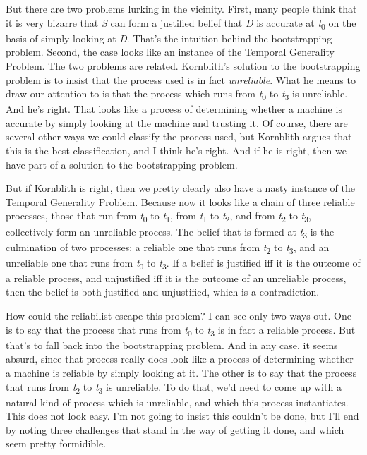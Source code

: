 \documentclass[
  11pt,
  letterpaper,
  DIV=11,
  numbers=noendperiod,
  twoside]{scrartcl}
\begin{document}
But there are two problems lurking in the vicinity. First, many people
think that it is very bizarre that \emph{S} can form a justified belief
that \emph{D} is accurate at \emph{t}\textsubscript{0} on the basis of
simply looking at \emph{D}. That's the intuition behind the
bootstrapping problem. Second, the case looks like an instance of the
Temporal Generality Problem. The two problems are related. Kornblith's
solution to the bootstrapping problem is to insist that the process used
is in fact \emph{unreliable}. What he means to draw our attention to is
that the process which runs from \emph{t}\textsubscript{0} to
\emph{t}\textsubscript{3} is unreliable. And he's right. That looks like
a process of determining whether a machine is accurate by simply looking
at the machine and trusting it. Of course, there are several other ways
we could classify the process used, but Kornblith argues that this is
the best classification, and I think he's right. And if he is right,
then we have part of a solution to the bootstrapping problem.

But if Kornblith is right, then we pretty clearly also have a nasty
instance of the Temporal Generality Problem. Because now it looks like a
chain of three reliable processes, those that run from
\emph{t}\textsubscript{0} to \emph{t}\textsubscript{1}, from
\emph{t}\textsubscript{1} to \emph{t}\textsubscript{2}, and from
\emph{t}\textsubscript{2} to \emph{t}\textsubscript{3}, collectively
form an unreliable process. The belief that is formed at
\emph{t}\textsubscript{3} is the culmination of two processes; a
reliable one that runs from \emph{t}\textsubscript{2} to
\emph{t}\textsubscript{3}, and an unreliable one that runs from
\emph{t}\textsubscript{0} to \emph{t}\textsubscript{3}. If a belief is
justified iff it is the outcome of a reliable process, and unjustified
iff it is the outcome of an unreliable process, then the belief is both
justified and unjustified, which is a contradiction.

How could the reliabilist escape this problem? I can see only two ways
out. One is to say that the process that runs from
\emph{t}\textsubscript{0} to \emph{t}\textsubscript{3} is in fact a
reliable process. But that's to fall back into the bootstrapping
problem. And in any case, it seems absurd, since that process really
does look like a process of determining whether a machine is reliable by
simply looking at it. The other is to say that the process that runs
from \emph{t}\textsubscript{2} to \emph{t}\textsubscript{3} is
unreliable. To do that, we'd need to come up with a natural kind of
process which is unreliable, and which this process instantiates. This
does not look easy. I'm not going to insist this couldn't be done, but
I'll end by noting three challenges that stand in the way of getting it
done, and which seem pretty formidible.
\end{document}
